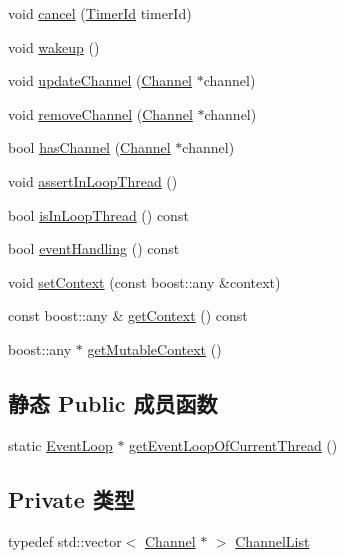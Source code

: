 \begin{DoxyCompactItemize}
\item 
void \hyperlink{classmuduo_1_1net_1_1EventLoop_af8b24b02bbff6a657fa5b0190bef9b9b}{cancel} (\hyperlink{classmuduo_1_1net_1_1TimerId}{Timer\+Id} timer\+Id)
\item 
void \hyperlink{classmuduo_1_1net_1_1EventLoop_ae674290a26ecbd622c5160e38e8a4fe9}{wakeup} ()
\item 
void \hyperlink{classmuduo_1_1net_1_1EventLoop_acaa4a191936aacf608d279a6f343d533}{update\+Channel} (\hyperlink{classmuduo_1_1net_1_1Channel}{Channel} $\ast$channel)
\item 
void \hyperlink{classmuduo_1_1net_1_1EventLoop_ab10f76c92cb5269f8296e5b3e4dd0ef9}{remove\+Channel} (\hyperlink{classmuduo_1_1net_1_1Channel}{Channel} $\ast$channel)
\item 
bool \hyperlink{classmuduo_1_1net_1_1EventLoop_a0647c81270e2be2510f0a97dde87e7a1}{has\+Channel} (\hyperlink{classmuduo_1_1net_1_1Channel}{Channel} $\ast$channel)
\item 
void \hyperlink{classmuduo_1_1net_1_1EventLoop_a9e9c23193ece3ba25a1a2779fc7ebc2d}{assert\+In\+Loop\+Thread} ()
\item 
bool \hyperlink{classmuduo_1_1net_1_1EventLoop_a1da5ae1e094c0136136b5344ef7a3b66}{is\+In\+Loop\+Thread} () const
\item 
bool \hyperlink{classmuduo_1_1net_1_1EventLoop_a54ddf02c262bfa4478b8fe33f62e2c7e}{event\+Handling} () const
\item 
void \hyperlink{classmuduo_1_1net_1_1EventLoop_a332ba7a521a446572051bc6939f4c4fa}{set\+Context} (const boost\+::any \&context)
\item 
const boost\+::any \& \hyperlink{classmuduo_1_1net_1_1EventLoop_aa6a547152bf0e64f8e18dc7146094e1f}{get\+Context} () const
\item 
boost\+::any $\ast$ \hyperlink{classmuduo_1_1net_1_1EventLoop_aca752855bdbb8cc6b18d05be1286b8f1}{get\+Mutable\+Context} ()
\end{DoxyCompactItemize}
\subsection*{静态 Public 成员函数}
\begin{DoxyCompactItemize}
\item 
static \hyperlink{classmuduo_1_1net_1_1EventLoop}{Event\+Loop} $\ast$ \hyperlink{classmuduo_1_1net_1_1EventLoop_a25f818975e3bdac238daa2b99bc0477b}{get\+Event\+Loop\+Of\+Current\+Thread} ()
\end{DoxyCompactItemize}
\subsection*{Private 类型}
\begin{DoxyCompactItemize}
\item 
typedef std\+::vector$<$ \hyperlink{classmuduo_1_1net_1_1Channel}{Channel} $\ast$ $>$ \hyperlink{classmuduo_1_1net_1_1EventLoop_a0b74248ffee6df294563618187b52404}{Channel\+List}
\end{DoxyCompactItemize}
